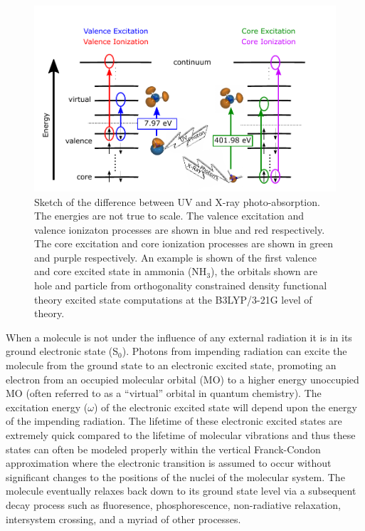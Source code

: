 \documentclass[final]{emory}
\begin{document}
\begin{figure}[h!]
\centering
\includegraphics[scale=0.7]{photochem_graphic.pdf}
\caption{Sketch of the difference between UV and X-ray photo-absorption. The energies are not true to scale. The valence excitation and valence ionizaton processes are shown in blue and red respectively. The core excitation and core ionization processes are shown in green and purple respectively. An example is shown of the first valence and core excited state in ammonia (NH$_3$), the orbitals shown are hole and particle from orthogonality constrained density functional theory excited state computations at the B3LYP/3-21G level of theory.}
\label{fig:photochem}
\end{figure}

When a molecule is not under the influence of any external radiation it is in its ground electronic state (S$_0$). Photons from impending radiation can excite the molecule from the ground state to an electronic excited state, promoting an electron from an occupied molecular orbital (MO) to a higher energy unoccupied MO (often referred to as a ``virtual'' orbital in quantum chemistry). The excitation energy ($\omega$) of the electronic excited state will depend upon the energy of the impending radiation. The lifetime of these electronic excited states are extremely quick compared to the lifetime of molecular vibrations and thus these states can often be modeled properly within the vertical Franck-Condon approximation \cite{franck_elementary_1926,condon_theory_1926,condon_nuclear_1928,hazra_first_2004} where the electronic transition is assumed to occur without significant changes to the positions of the nuclei of the molecular system. The molecule eventually relaxes back down to its ground state level via a subsequent decay process such as fluoresence, \cite{maxwell_chlorophyll_2000,valeur_molecular_2012} phosphorescence, \cite{tanaka_observation_2005,romanovskii_phosphorescence_2000,cavar_fluorescence_2005} non-radiative relaxation, \cite{callomon_non-radiative_1972,de_mello_donega_non-radiative_1995} intersystem crossing, \cite{lamola_mechanisms_1965,hauser_intersystem_1991} and a myriad of other processes. \cite{zakrzewski_threshold_1984,meskers_relaxation_2000,vant_hof_zero-field_1976,hors_cross-relaxation_1982}
\end{document}
